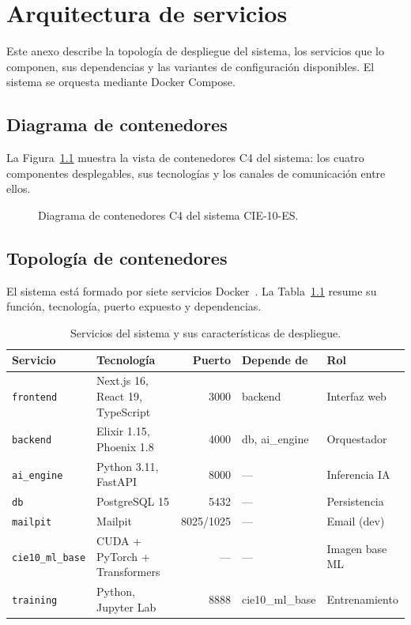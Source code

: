 \chapter{Arquitectura de servicios}
\label{cap:AnexoB}

Este anexo describe la topología de despliegue del sistema, los servicios que lo componen, sus dependencias y las variantes de configuración disponibles. El sistema se orquesta mediante Docker Compose.

\section{Diagrama de contenedores}

La Figura~\ref{fig:c4-contenedores} muestra la vista de contenedores C4 del sistema: los cuatro componentes desplegables, sus tecnologías y los canales de comunicación entre ellos.

\begin{figure}[ht]
\centering
\resizebox{\textwidth}{!}{}
\caption{Diagrama de contenedores C4 del sistema CIE-10-ES.}
\label{fig:c4-contenedores}
\end{figure}

\section{Topología de contenedores}

El sistema está formado por siete servicios Docker~\cite{merkel2014docker}. La Tabla~\ref{tab:servicios} resume su función, tecnología, puerto expuesto y dependencias.

\begin{table}[h]
\centering
\caption{Servicios del sistema y sus características de despliegue.}
\label{tab:servicios}
\begin{tabular}{lp{3.5cm}rp{2.5cm}l}
\hline
\textbf{Servicio} & \textbf{Tecnología} & \textbf{Puerto} & \textbf{Depende de} & \textbf{Rol} \\
\hline
\texttt{frontend}   & Next.js 16, React 19, TypeScript & 3000  & backend         & Interfaz web \\
\texttt{backend}    & Elixir 1.15, Phoenix 1.8         & 4000  & db, ai\_engine  & Orquestador \\
\texttt{ai\_engine} & Python 3.11, FastAPI             & 8000  & —               & Inferencia IA \\
\texttt{db}         & PostgreSQL 15                    & 5432  & —               & Persistencia \\
\texttt{mailpit}    & Mailpit                          & 8025/1025 & —           & Email (dev) \\
\texttt{cie10\_ml\_base} & CUDA + PyTorch + Transformers & — & —               & Imagen base ML \\
\texttt{training}   & Python, Jupyter Lab              & 8888  & cie10\_ml\_base & Entrenamiento \\
\hline
\end{tabular}
\end{table}

